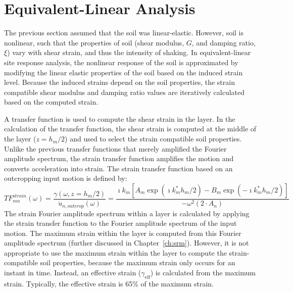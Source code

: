 \documentclass[11pt]{report}
\begin{document}
\section{Equivalent-Linear Analysis}\label{ch:sra:equivLinear}
The previous section assumed that the soil was linear-elastic. However, soil is nonlinear, such that
the properties of soil (shear modulus, $G$, and damping ratio, $\xi$) vary with shear strain, and
thus the intensity of shaking.  In equivalent-linear site response analysis, the nonlinear response
of the soil is approximated by modifying the linear elastic properties of the soil based on the
induced strain level.  Because the induced strains depend on the soil properties, the strain
compatible shear modulus and damping ratio values are iteratively calculated based on the computed
strain.  

A transfer function is used to compute the shear strain in the layer.  In the calculation of the
transfer function, the shear strain is computed at the middle of the layer ($z=h_m/2$) and used to
select the strain compatible soil properties.  Unlike the previous transfer functions that merely
amplified the Fourier amplitude spectrum, the strain transfer function amplifies the motion and converts acceleration into strain.  The strain transfer
function based on an outcropping input motion is defined by:
\begin{equation}
  TF_{mn}^{strain}(\omega) = \frac{\gamma(\omega, z=h_m/2)}{\ddot{u}_{n,outcrop}(\omega)} =
  \frac{\imath k_m \left[
  A_m \exp\left( \imath k_m^* h_m / 2 \right) - B_m \exp\left( -\imath k_m^* h_m / 2 \right) \right]
  }{-\omega^2 \left( 2 \cdot A_n \right)}
  \label{eq:strain_tf}
\end{equation}
The strain Fourier amplitude spectrum within a layer is calculated by applying the strain transfer
function to the Fourier amplitude spectrum of the input motion.  The maximum strain within the layer
is computed from this Fourier amplitude spectrum (further discussed in Chapter~\ref{ch:srm}).  However, it
is not appropriate to use the maximum strain within the layer to compute the strain-compatible soil
properties, because the maximum strain only occurs for an instant in time.  Instead, an effective
strain ($\gamma_{\mathrm{eff}}$) is calculated from the maximum strain.  Typically, the effective
strain is 65\% of the maximum strain. 
\end{document}
